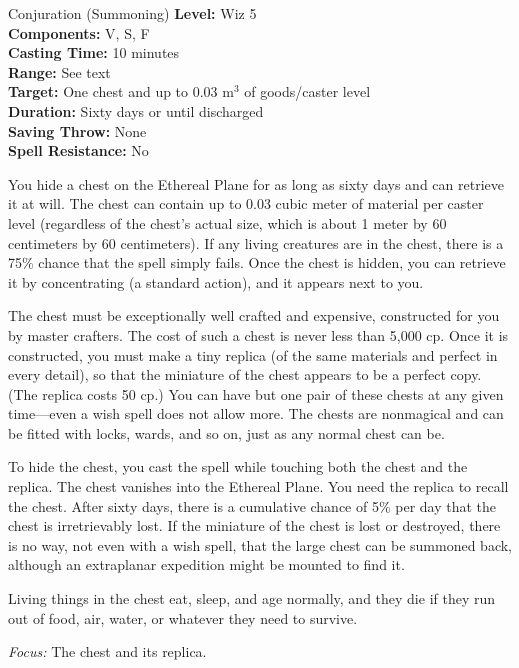 {Conjuration (Summoning)}
{
	\textbf{Level:}
	Wiz 5\\
	\textbf{Components:}
	V, S, F\\
	\textbf{Casting Time:}
	10 minutes\\
	\textbf{Range:}
	See text\\
	\textbf{Target:}
	One chest and up to 0.03 m$^3$ of goods/caster level\\
	\textbf{Duration:}
	Sixty days or until discharged\\
	\textbf{Saving Throw:}
	None\\
	\textbf{Spell Resistance:}
	No\\
}
{
	You hide a chest on the Ethereal Plane for as long as sixty days and can retrieve it at will. The chest can contain up to 0.03 cubic meter of material per caster level (regardless of the chest's actual size, which is about 1 meter by 60 centimeters by 60 centimeters). If any living creatures are in the chest, there is a 75\% chance that the spell simply fails. Once the chest is hidden, you can retrieve it by concentrating (a standard action), and it appears next to you.

	The chest must be exceptionally well crafted and expensive, constructed for you by master crafters. The cost of such a chest is never less than 5,000 cp. Once it is constructed, you must make a tiny replica (of the same materials and perfect in every detail), so that the miniature of the chest appears to be a perfect copy. (The replica costs 50 cp.) You can have but one pair of these chests at any given time---even a wish spell does not allow more. The chests are nonmagical and can be fitted with locks, wards, and so on, just as any normal chest can be.

	To hide the chest, you cast the spell while touching both the chest and the replica. The chest vanishes into the Ethereal Plane. You need the replica to recall the chest. After sixty days, there is a cumulative chance of 5\% per day that the chest is irretrievably lost. If the miniature of the chest is lost or destroyed, there is no way, not even with a wish spell, that the large chest can be summoned back, although an extraplanar expedition might be mounted to find it.

	Living things in the chest eat, sleep, and age normally, and they die if they run out of food, air, water, or whatever they need to survive.

	\textit{Focus:}
	The chest and its replica.

}
